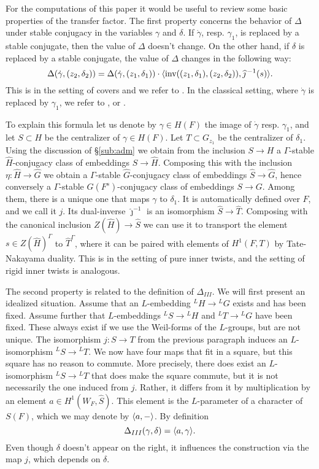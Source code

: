 \documentclass{article}
\theoremstyle{definition}
\numberwithin{equation}{section}
\renewcommand{\-}{\hyp{}}
\begin{document}
For the computations of this paper it would be useful to review some basic properties of the transfer factor. The first property concerns the behavior of $\Delta$ under stable conjugacy in the variables $\gamma$ and $\delta$. If $\dot\gamma$, resp. $\gamma_1$, is replaced by a stable conjugate, then the value of $\Delta$ doesn't change. On the other hand, if $\delta$ is replaced by a stable conjugate, the value of $\Delta$ changes in the following way:
\begin{equation} \label{eq:tfstab}
	\Delta(\dot\gamma,(z_2,\delta_2)) = \Delta(\dot\gamma,(z_1,\delta_1)) \cdot \langle\textrm{inv}((z_1,\delta_1),(z_2,\delta_2)),\widehat \jmath\,^{-1}(s)\rangle.
\end{equation}
This is in the setting of covers and we refer to \cite[Lemma 4.3.1]{KalHDC}. In the classical setting, where $\dot\gamma$ is replaced by $\gamma_1$, we refer to \cite[Definitions 4.2.7,4.3.11]{KalIMS}, or \cite[\S4.1]{LS87}.

To explain this formula let us denote by $\gamma \in H(F)$ the image of $\dot\gamma$ resp. $\gamma_1$, and let $S \subset H$ be the centralizer of $\gamma \in H(F)$. Let $T \subset G_{z_1}$ be the centralizer of $\delta_1$. Using the discussion of \S\ref{sub:adm} we obtain from the inclusion $S \to H$ a $\Gamma$-stable $\hat H$-conjugacy class of embeddings $\hat S \to \hat H$. Composing this with the inclusion $\eta : \hat H \to \hat G$ we obtain a $\Gamma$-stable $\hat G$-conjugacy class of embeddings $\hat S \to \hat G$, hence conversely a $\Gamma$-stable $G(F^s)$-conjugacy class of embeddings $S \to G$. Among them, there is a unique one that maps $\gamma$ to $\delta_1$. It is automatically defined over $F$, and we call it $j$. Its dual-inverse $\hat\jmath^{-1}$ is an isomorphism $\hat S \to \hat T$. Composing with the canonical inclusion $Z(\hat H) \to \hat S$ we can use it to transport the element $s \in Z(\hat H)^\Gamma$ to $\hat T^\Gamma$, where it can be paired with elements of $H^1(F,T)$ by Tate-Nakayama duality. This is in the setting of pure inner twists, and the setting of rigid inner twists is analogous.

The second property is related to the definition of $\Delta_{III}$. We will first present an idealized situation. Assume that an $L$\-embedding $^LH \to {^LG}$ exists and has been fixed. Assume further that $L$\-embeddings $^LS \to {^LH}$ and $^LT \to {^LG}$ have been fixed. These always exist if we use the Weil-forms of the $L$\-groups, but are not unique. The isomorphism $j : S \to T$ from the previous paragraph induces an $L$\-isomorphism $^LS \to {^LT}$. We now have four maps that fit in a square, but this square has no reason to commute. More precisely, there does exist an $L$\-isomorphism $^LS \to {^LT}$ that does make the square commute, but it is not necessarily the one induced from $j$. Rather, it differs from it by multiplication by an element $a \in H^1(W_F,\hat S)$. This element is the $L$\-parameter of a character of $S(F)$, which we may denote by $\langle a,-\rangle$. By definition
\[ \Delta_{III}(\gamma,\delta)=\langle a,\gamma\rangle. \]
Even though $\delta$ doesn't appear on the right, it influences the construction via the map $j$, which depends on $\delta$. 
\end{document}
